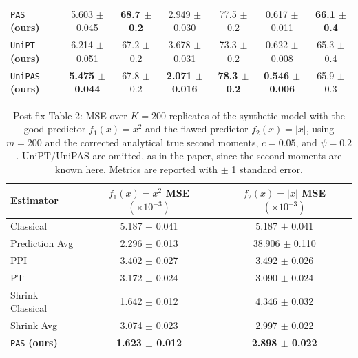 \documentclass[11pt]{article}
\begin{document}
\begin{table}[H]
\begin{tabular}{lcccccc}
    \texttt{PAS} \textbf{(ours)} & 5.603 $\pm$ 0.045 & \textbf{68.7 $\pm$ 0.2} & 2.949 $\pm$ 0.030 & 77.5 $\pm$ 0.2 & 0.617 $\pm$ 0.011 & \textbf{66.1 $\pm$ 0.4} \\
    \texttt{UniPT} \textbf{(ours)} & 6.214 $\pm$ 0.051 & 67.2 $\pm$ 0.2 & 3.678 $\pm$ 0.031 & 73.3 $\pm$ 0.2 & 0.622 $\pm$ 0.008 & 65.3 $\pm$ 0.4 \\
    \texttt{UniPAS} \textbf{(ours)} & \textbf{5.475 $\pm$ 0.044} & 67.8 $\pm$ 0.2 & \textbf{2.071 $\pm$ 0.016} & \textbf{78.3 $\pm$ 0.2} & \textbf{0.546 $\pm$ 0.006} & 65.9 $\pm$ 0.3 \\
    \bottomrule
    \end{tabular}
\end{table}

\begin{table}[H]
    \centering
    \caption{Post-fix Table 2: MSE over $K = 200$ replicates of the synthetic model with the good predictor $f_1(x) = x^2$ and the flawed predictor $f_2(x) = |x|$, using $m=200$ and the corrected analytical true second moments, $c=0.05$, and $\psi=0.2$. UniPT/UniPAS are omitted, as in the paper, since the second moments are known here. Metrics are reported with $\pm$ 1 standard error.}
    \label{tbl:postfix_synthetic}
    \vskip 0.05in
    \footnotesize
    \begin{tabular}{lcc}
    \toprule
    \textbf{Estimator} & \textbf{$f_1(x) = x^2$} \textbf{MSE} \( (\times 10^{-3}) \) & \textbf{$f_2(x) = |x|$} \textbf{MSE} \( (\times 10^{-3}) \) \\
    \midrule
    Classical & 5.187 $\pm$ 0.041 & 5.187 $\pm$ 0.041 \\
    Prediction Avg & 2.296 $\pm$ 0.013 & 38.906 $\pm$ 0.110 \\
    PPI & 3.402 $\pm$ 0.027 & 3.492 $\pm$ 0.026 \\
    PT & 3.172 $\pm$ 0.024 & 3.090 $\pm$ 0.024 \\
    Shrink Classical & 1.642 $\pm$ 0.012 & 4.346 $\pm$ 0.032 \\
    Shrink Avg & 3.074 $\pm$ 0.023 & 2.997 $\pm$ 0.022 \\
    \texttt{PAS} \textbf{(ours)} & \textbf{1.623 $\pm$ 0.012} & \textbf{2.898 $\pm$ 0.022} \\
    \bottomrule
    \end{tabular}
\end{table}
\end{document}
